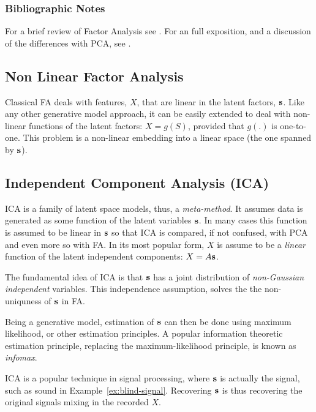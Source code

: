 \documentclass[12pt,a4paper]{article}
\begin{document}
\subsubsection{Bibliographic Notes}
For a brief review of Factor Analysis see \cite{friedman2001elements}.
For an full exposition, and a discussion of the differences with PCA, see \cite{jolliffe2002principal}.


\subsection{Non Linear Factor Analysis}
Classical FA deals with features, $X$, that are linear in the latent factors, $\mathbf{s}$. 
Like any other generative model approach, it can be easily extended to deal with non-linear functions of the latent factors: $X=g(S)$, provided that $g(.)$ is one-to-one. 
This problem is a non-linear embedding into a linear space (the one spanned by $\mathbf{s}$).





\subsection{Independent Component Analysis (ICA)}
\label{sec:ica}


ICA is a family of latent space models, thus, a \emph{meta-method}.
It assumes data is generated as some function of the latent variables $\mathbf{s}$. 
In many cases this function is assumed to be linear in $\mathbf{s}$ so that ICA is compared, if not confused, with PCA and even more so with FA. 
In its most popular form, $X$ is assume to be a \emph{linear} function of the latent independent components: $X=A \mathbf{s}$.

The fundamental idea of ICA is that $\mathbf{s}$ has a joint distribution of \emph{non-Gaussian independent} variables. 
This independence assumption, solves the the non-uniquness of $\mathbf{s}$ in FA.

Being a generative model, estimation of $\mathbf{s}$ can then be done using maximum likelihood, or other estimation principles. 
A popular information theoretic estimation principle, replacing the maximum-likelihood principle, is known as \emph{infomax}.

ICA is a popular technique in signal processing, where $\mathbf{s}$ is actually the signal, such as sound in Example~\ref{ex:blind-signal}.
Recovering $\mathbf{s}$ is thus recovering the original signals mixing in the recorded $X$. 
\end{document}
